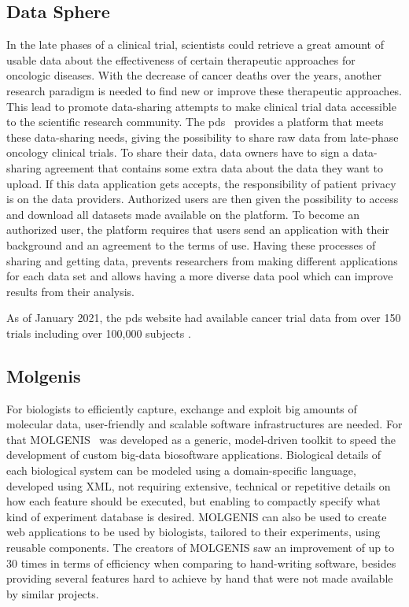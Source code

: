 \subsection*{Data Sphere}
In the late phases of a clinical trial, scientists could retrieve a great amount of usable data about the effectiveness of certain therapeutic approaches for oncologic diseases.
With the decrease of cancer deaths over the years, another research paradigm is needed to find new or improve these therapeutic approaches.
This lead to promote data-sharing attempts to make clinical trial data accessible to the scientific research community.
The \gls{pds}~\cite{datasphere} provides a platform that meets these data-sharing needs, giving the possibility to share raw data from late-phase oncology clinical trials.
To share their data, data owners have to sign a data-sharing agreement that contains some extra data about the data they want to upload.
If this data application gets accepts, the responsibility of patient privacy is on the data providers.
Authorized users are then given the possibility to access and download all datasets made available on the platform.
To become an authorized user, the platform requires that users send an application with their background and an agreement to the terms of use.
Having these processes of sharing and getting data, prevents researchers from making different applications for each data set and allows having a more diverse data pool which can improve results from their analysis.

As of January 2021, the \gls{pds} website had available cancer trial data from over 150 trials including over 100,000 subjects \cite{datasphere-site}.

\subsection*{Molgenis}
For biologists to efficiently capture, exchange and exploit big amounts of molecular data, user-friendly and scalable software infrastructures are needed.
For that MOLGENIS~\cite{molgenis} was developed as a generic, model-driven toolkit to speed the development of custom big-data biosoftware applications.
Biological details of each biological system can be modeled using a domain-specific language, developed using XML, not requiring extensive, technical or repetitive details on how each feature should be executed, but enabling to compactly specify what kind of experiment database is desired.
MOLGENIS can also be used to create web applications to be used by biologists, tailored to their experiments, using reusable components.
The creators of MOLGENIS saw an improvement of up to 30 times in terms of efficiency when comparing to hand-writing software, besides providing several features hard to achieve by hand that were not made available by similar projects.

